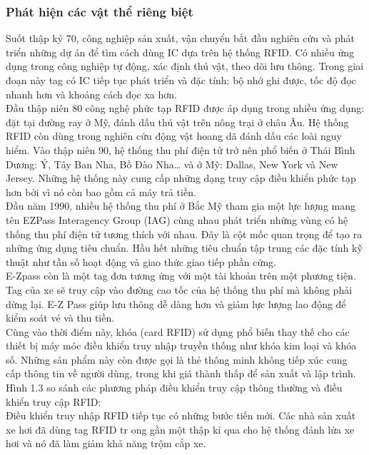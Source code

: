 \subsubsection{Phát hiện các vật thể riêng biệt}
Suốt thập kỷ 70, công nghiệp sản xuất, vận chuyển bắt đầu nghiên cứu và phát triển những dự án để tìm cách dùng IC dựa trên hệ thống RFID. Có nhiều ứng dụng trong công nghiệp tự động, xác định thú vật, theo dõi lưu thông. Trong giai đoạn này tag có IC tiếp tục phát triển và đặc tính: bộ nhớ ghi được, tốc độ đọc nhanh hơn và khoảng cách đọc xa hơn.\\
Đầu thập niên 80 công nghệ phức tạp RFID được áp dụng trong nhiều ứng dụng: đặt tại đường ray ở Mỹ, đánh dấu thú vật trên nông trại ở châu Âu. Hệ thống RFID còn dùng trong nghiên cứu động vật hoang dã đánh dấu các loài nguy hiểm. Vào thập niên 90, hệ thống thu phí điện tử trở nên phổ biến ở Thái Bình Dương: Ý, Tây Ban Nha, Bồ Đào Nha… và ở Mỹ: Dallas, New York và New Jersey. Những hệ thống này cung cấp những dạng truy cập điều khiển phức tạp hơn bởi vì nó còn bao gồm cả máy trả tiền.\\
Đầu năm 1990, nhiều hệ thống thu phí ở Bắc Mỹ tham gia một lực lượng mang tên EZPass Interagency Group (IAG) cùng nhau phát triển những vùng có hệ thống thu phí điện tử tương thích với nhau. Đây là cột mốc quan trọng để tạo ra những ứng dụng tiêu chuẩn. Hầu hết những tiêu chuẩn tập trung các đặc tính kỹ thuật như tần số hoạt động và giao thức giao tiếp phần cứng. \\
E-Zpass còn là một tag đơn tương ứng với một tài khoản trên một phương tiện. Tag của xe sẽ truy cập vào đường cao tốc của hệ thống thu phí mà không phải dừng lại. E-Z Pass giúp lưu thông dễ dàng hơn và giảm lực lượng lao động để kiểm soát vé và thu tiền.\\
Cùng vào thời điểm này, khóa (card RFID) sử dụng phổ biến thay thế cho các thiết bị máy móc điều khiển truy nhập truyền thống như khóa kim loại và khóa số. Những sản phẩm này còn được gọi là thẻ thông minh không tiếp xúc cung cấp thông tin về người dùng, trong khi giá thành thấp để sản xuất và lập trình. Hình 1.3 so sánh các phương pháp điều khiển truy cập thông thường và điều khiển truy cập RFID:
\label{ref{fig1_3}}
\\
Điều khiển truy nhập RFID tiếp tục có những bước tiến mới. Các nhà sản xuất xe hơi đã dùng tag RFID tr	ong gần một thập kỉ qua cho hệ thống đánh lửa xe hơi và nó đã làm giảm khả năng trộm cắp xe.
\label{ref{fig1_4}}

